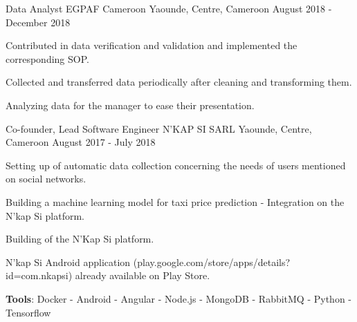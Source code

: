 \begin{cventries}
  \cventry
    {Data Analyst} %
    {EGPAF Cameroon} %
    {Yaounde, Centre, Cameroon} %
    {August 2018 - December 2018} %
    {
      \begin{cvitems} %
        \item {Contributed in data verification and validation and implemented the corresponding SOP.}
        \item {Collected and transferred data periodically after cleaning and transforming them.}
        \item {Analyzing data for the manager to ease their presentation.}
      \end{cvitems}
    }

  \cventry
    {Co-founder, Lead Software Engineer} %
    {N'KAP SI SARL} %
    {Yaounde, Centre, Cameroon} %
    {August 2017 - July 2018} %
    {
      \begin{cvitems} %
        \item {Setting up of automatic data collection concerning the needs of users mentioned on social networks.}
        \item {Building a machine learning model for taxi price prediction - Integration on the N'kap Si platform.}
        \item {Building of the N'Kap Si platform.}
        \item {N'kap Si Android application (play.google.com/store/apps/details?id=com.nkapsi) already available on Play Store.}
        \item {\textbf{Tools}: Docker - Android - Angular - Node.js - MongoDB - RabbitMQ - Python - Tensorflow}
      \end{cvitems}
    }


\end{cventries}

